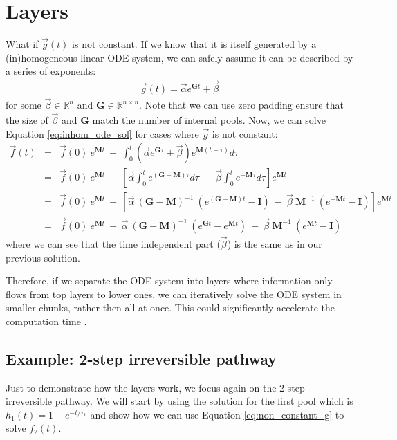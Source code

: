 \documentclass{article}
\begin{document}
\section{Layers}
What if $\vec{g}(t)$ is not constant. If we know that it is itself generated by a (in)homogeneous linear ODE system, we can safely assume it can be described by a series of exponents:
\begin{eqnarray}
    \vec{g}(t) = \vec{\alpha} e^{\mathbf{G} t} + \vec{\beta}
\end{eqnarray}
for some $\vec{\beta} \in \mathbb{R}^n$ and $\mathbf{G} \in \mathbb{R}^{n \times n}$. Note that we can use zero padding ensure that the size of $\vec{\beta}$ and $\mathbf{G}$ match the number of internal pools. Now, we can solve Equation \ref{eq:inhom_ode_sol} for cases where $\vec{g}$ is not constant:
\begin{eqnarray}
    \vec{f}(t) &=&
    \vec{f}(0)~e^{\mathbf{M} t} ~+~ \int_0^t \left(\vec{\alpha} e^{\mathbf{G} \tau} + \vec{\beta}\right) e^{\mathbf{M} (t-\tau)} d\tau \nonumber\\
    &=&
    \vec{f}(0)~e^{\mathbf{M} t} ~+~ \left[
    \vec{\alpha} \int_0^t e^{(\mathbf{G} - \mathbf{M})\tau} d\tau ~+~ 
    \vec{\beta} \int_0^t e^{-\mathbf{M}\tau} d\tau 
    \right] e^{\mathbf{M} t} \nonumber\\
    &=& 
    \vec{f}(0)~e^{\mathbf{M} t} ~+~ \left[
    \vec{\alpha}~(\mathbf{G}-\mathbf{M})^{-1}~(e^{(\mathbf{G} - \mathbf{M})t} - \mathbf{I}) ~-~ 
    \vec{\beta}~\mathbf{M}^{-1}~(e^{-\mathbf{M}t} - \mathbf{I})
    \right] e^{\mathbf{M} t} \nonumber\\
    &=&
    \vec{f}(0)~e^{\mathbf{M} t} ~+~
    \vec{\alpha}~(\mathbf{G}-\mathbf{M})^{-1}~(e^{\mathbf{G}t} - e^{\mathbf{M}t}) ~+~ 
    \vec{\beta}~\mathbf{M}^{-1}~(e^{\mathbf{M} t} - \mathbf{I})
    \label{eq:non_constant_g}
\end{eqnarray}
where we can see that the time independent part ($\vec{\beta}$) is the same as in our previous solution.

Therefore, if we separate the ODE system into layers where information only flows from top layers to lower ones, we can iteratively solve the ODE system in smaller chunks, rather then all at once. This could significantly accelerate the computation time \cite{young_elementary_2008}.

\subsection{Example: 2-step irreversible pathway}
Just to demonstrate how the layers work, we focus again on the 2-step irreversible pathway. We will start by using the solution for the first pool which is $h_1(t) = 1 - e^{-t/\tau_1}$ and show how we can use Equation \ref{eq:non_constant_g} to solve $f_2(t)$.
\end{document}
